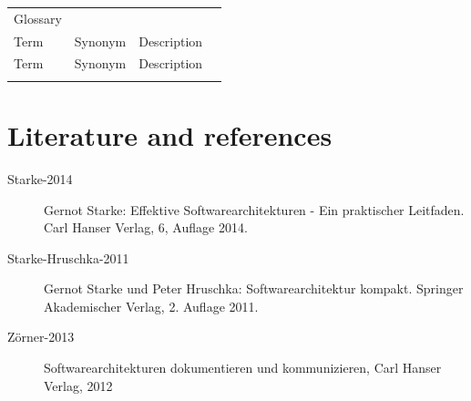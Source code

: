 \documentclass[]{article}
\begin{document}
\begin{longtable}[c]{@{}llll@{}}
\toprule\addlinespace
\begin{minipage}[b]{0.22\columnwidth}\raggedright
Glossary
\end{minipage} & \begin{minipage}[b]{0.22\columnwidth}\raggedright
\end{minipage} & \begin{minipage}[b]{0.22\columnwidth}\raggedright
\end{minipage} & \begin{minipage}[b]{0.22\columnwidth}\raggedright
\end{minipage}
\\\addlinespace
\midrule\endhead
\begin{minipage}[t]{0.22\columnwidth}\raggedright
Term
\end{minipage} & \begin{minipage}[t]{0.22\columnwidth}\raggedright
Synonym
\end{minipage} & \begin{minipage}[t]{0.22\columnwidth}\raggedright
Description
\end{minipage} & \begin{minipage}[t]{0.22\columnwidth}\raggedright
\end{minipage}
\\\addlinespace
\begin{minipage}[t]{0.22\columnwidth}\raggedright
Term
\end{minipage} & \begin{minipage}[t]{0.22\columnwidth}\raggedright
Synonym
\end{minipage} & \begin{minipage}[t]{0.22\columnwidth}\raggedright
Description
\end{minipage} & \begin{minipage}[t]{0.22\columnwidth}\raggedright
\end{minipage}
\\\addlinespace
\bottomrule
\end{longtable}

\section{Literature and references}

\begin{description}
\item[Starke-2014]
Gernot Starke: Effektive Softwarearchitekturen - Ein praktischer
Leitfaden. Carl Hanser Verlag, 6, Auflage 2014.
\item[Starke-Hruschka-2011]
Gernot Starke und Peter Hruschka: Softwarearchitektur kompakt. Springer
Akademischer Verlag, 2. Auflage 2011.
\item[Zörner-2013]
Softwarearchitekturen dokumentieren und kommunizieren, Carl Hanser
Verlag, 2012
\end{description}
\end{document}
